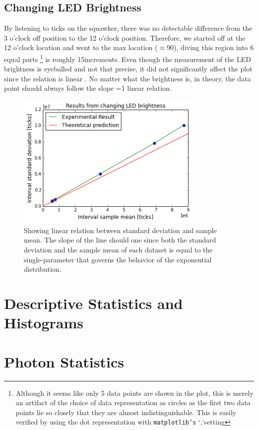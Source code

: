 \documentclass{article}
\begin{document}
   \subsection{Changing LED Brightness}
\indent By listening to ticks on the squawker, there was no detectable difference from the 3 o'clock off position to the 12 o'clock position. Therefore, we started off at the 12 o'clock location and went to the max location ($\approx$90\degree), diving this region into 6 equal parts \footnote{Although it seems like only 5 data points are shown in the plot, this is merely an artifact of the choice of data representation as circles as  the first two data points lie so closely that they are almost indistinguishable. This is easily verified by using the dot representation with \texttt{matplotlib's} `,`setting} is roughly 15\degree  increments. Even though the measurement of the LED brightness is eyeballed and not that precise, it did not significantly affect the plot since the relation is linear . No matter what the brightness is, in theory, the data point should always follow the slope =1 linear relation.
\begin{figure}[h]
\centering
\includegraphics[width=0.8\textwidth]{figures/changeLED}
\caption{Showing linear relation between standard deviation and sample mean. The slope of the line should one since both the standard deviation and the sample mean of each dataset is equal to the single-parameter that governs the behavior of the exponential distribution.}
\label{changeLED}
\end{figure}
\section{Descriptive Statistics and Histograms\label{stats}}

\section{Photon Statistics\label{pstats}}
\end{document}
